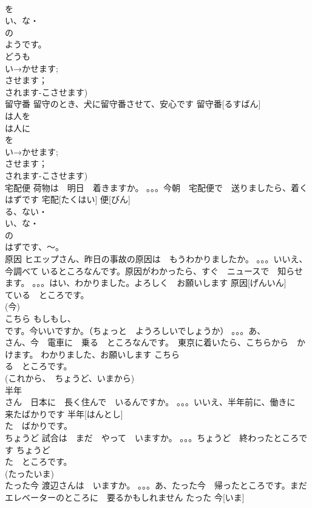 \documentclass[8pt]{extreport}
\begin{document}
\begin{CJK}{UTF8}{min}
\\	を
\\	い、な・
\\	の
\\	ようです。
\\	どうも
\\	い→かせます;
\\	させます；
\\	されます-こさせます)
\\	留守番	留守のとき、犬に留守番させて、安心です	留守番[るすばん]				
\\	は人を
\\	は人に
\\	を
\\	い→かせます;
\\	させます；
\\	されます-こさせます)
\\	宅配便	荷物は　明日　着きますか。 。。。今朝　宅配便で　送りましたら、着くはずです	宅配[たくはい] 便[びん]				
\\	る、ない・
\\	い、な・
\\	の
\\	はずです、～。
\\	原因	ヒエップさん、昨日の事故の原因は　もうわかりましたか。 。。。いいえ、今調べて いるところなんです。原因がわかったら、すぐ　ニュースで　知らせます。 。。。はい、わかりました。よろしく　お願いします	原因[げんいん]				
\\	ている　ところです。　
\\	(今)	
\\	こちら	もしもし、
\\	です。今いいですか。（ちょっと　ようろしいでしょうか） 。。。あ、
\\	さん、今　電車に　乗る　ところなんです。　東京に着いたら、こちらから　かけます。 わかりました、お願いします	こちら			
\\	る　ところです。
\\	(これから、　ちょうど、いまから)		
\\	半年	
\\	さん　日本に　長く住んで　いるんですか。 。。。いいえ、半年前に、働きに　来たばかりです	半年[はんとし]				
\\	た　ばかりです。
\\	ちょうど	試合は　まだ　やって　いますか。 。。。ちょうど　終わったところです	ちょうど				
\\	た　ところです。　
\\	(たったいま)		
\\	たった今	渡辺さんは　いますか。 。。。あ、たった今　帰ったところです。まだ　エレベーターのところに　要るかもしれません	たった 今[いま]			

\end{CJK}
\end{document}
